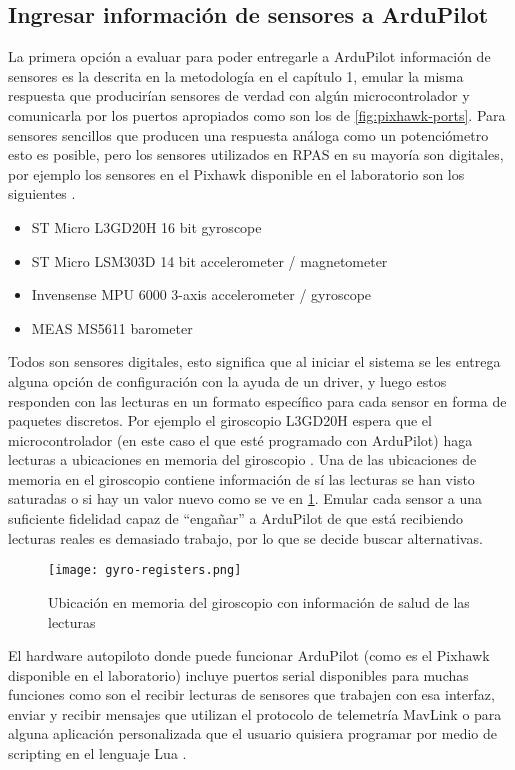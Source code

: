 \subsection{Ingresar información de sensores a ArduPilot}

La primera opción a evaluar para poder entregarle a ArduPilot información de sensores es la descrita en la metodología en el capítulo 1, emular la misma respuesta que producirían sensores de verdad con algún microcontrolador y comunicarla por los puertos apropiados como son los de \cref{fig:pixhawk-ports}. Para sensores sencillos que producen una respuesta análoga como un potenciómetro esto es posible, pero los sensores utilizados en RPAS en su mayoría son digitales, por ejemplo los sensores en el Pixhawk disponible en el laboratorio son los siguientes \cite{pixhawk1}.

\begin{itemize}
    \item ST Micro L3GD20H 16 bit gyroscope
    \item ST Micro LSM303D 14 bit accelerometer / magnetometer
    \item Invensense MPU 6000 3-axis accelerometer / gyroscope
    \item MEAS MS5611 barometer
\end{itemize}

Todos son sensores digitales, esto significa que al iniciar el sistema se les entrega alguna opción de configuración con la ayuda de un driver, y luego estos responden con las lecturas en un formato específico para cada sensor en forma de paquetes discretos. Por ejemplo el giroscopio L3GD20H espera que el microcontrolador (en este caso el que esté programado con ArduPilot) haga lecturas a ubicaciones en memoria del giroscopio \cite{gyro-datasheet}. Una de las ubicaciones de memoria en el giroscopio contiene información de sí las lecturas se han visto saturadas o si hay un valor nuevo como se ve en \cref{fig:gyro-health}. Emular cada sensor a una suficiente fidelidad capaz de ``engañar'' a ArduPilot de que está recibiendo lecturas reales es demasiado trabajo, por lo que se decide buscar alternativas.

\begin{figure}[h]
    \centering
    \texttt{[image: gyro-registers.png]}
    \caption{Ubicación en memoria del giroscopio con información de salud de las lecturas}
    \label{fig:gyro-health}
\end{figure}

El hardware autopiloto donde puede funcionar ArduPilot (como es el Pixhawk disponible en el laboratorio) incluye puertos serial disponibles para muchas funciones como son el recibir lecturas de sensores que trabajen con esa interfaz, enviar y recibir mensajes que utilizan el protocolo de telemetría MavLink \cite{ap-serial} o para alguna aplicación personalizada que el usuario quisiera programar por medio de scripting en el lenguaje Lua \cite{ap-scripting}.

